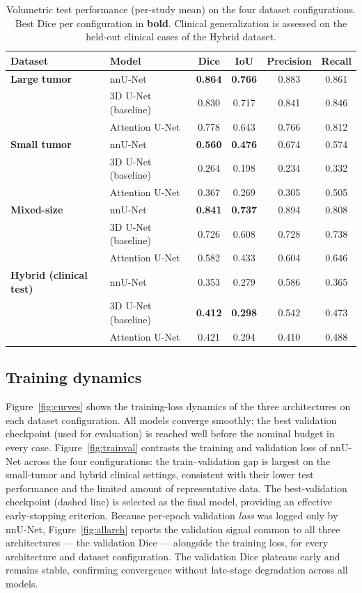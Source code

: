 \documentclass[11pt]{article}
\newcommand{\best}[1]{\textbf{#1}}
\begin{document}
\begin{table}[H]
\centering
\caption{Volumetric test performance (per-study mean) on the four dataset
configurations. Best Dice per configuration in \best{bold}. Clinical generalization
is assessed on the held-out clinical cases of the Hybrid dataset.}
\label{tab:main}
\small
\begin{tabular}{llcccc}
\toprule
Dataset & Model & Dice & IoU & Precision & Recall \\
\midrule
\textbf{Large tumor}
 & nnU-Net            & \best{0.864} & \best{0.766} & 0.883 & 0.861 \\
 & 3D U-Net (baseline)& 0.830 & 0.717 & 0.841 & 0.846 \\
 & Attention U-Net    & 0.778 & 0.643 & 0.766 & 0.812 \\
\addlinespace
\textbf{Small tumor}
 & nnU-Net            & \best{0.560} & \best{0.476} & 0.674 & 0.574 \\
 & 3D U-Net (baseline)& 0.264 & 0.198 & 0.234 & 0.332 \\
 & Attention U-Net    & 0.367 & 0.269 & 0.305 & 0.505 \\
\addlinespace
\textbf{Mixed-size}
 & nnU-Net            & \best{0.841} & \best{0.737} & 0.894 & 0.808 \\
 & 3D U-Net (baseline)& 0.726 & 0.608 & 0.728 & 0.738 \\
 & Attention U-Net    & 0.582 & 0.433 & 0.604 & 0.646 \\
\addlinespace
\textbf{Hybrid (clinical test)}
 & nnU-Net            & 0.353 & 0.279 & 0.586 & 0.365 \\
 & 3D U-Net (baseline)& \best{0.412} & \best{0.298} & 0.542 & 0.473 \\
 & Attention U-Net    & 0.421 & 0.294 & 0.410 & 0.488 \\
\bottomrule
\end{tabular}
\end{table}

\subsection{Training dynamics}
Figure~\ref{fig:curves} shows the training-loss dynamics of the three architectures
on each dataset configuration. All models converge smoothly; the best validation
checkpoint (used for evaluation) is reached well before the nominal budget in every
case. Figure~\ref{fig:trainval} contrasts the training and validation loss of
nnU-Net across the four configurations: the train--validation gap is largest on the
small-tumor and hybrid clinical settings, consistent with their lower test
performance and the limited amount of representative data. The best-validation
checkpoint (dashed line) is selected as the final model, providing an effective
early-stopping criterion. Because per-epoch validation \emph{loss} was logged only by
nnU-Net, Figure~\ref{fig:allarch} reports the validation signal common to all three
architectures --- the validation Dice --- alongside the training loss, for every
architecture and dataset configuration. The validation Dice plateaus early and remains
stable, confirming convergence without late-stage degradation across all models.
\end{document}

